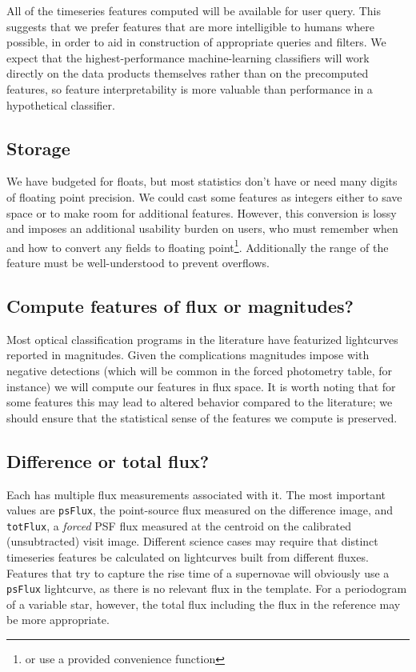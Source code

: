 \documentclass[DM,authoryear,toc]{lsstdoc}
\begin{document}
All of the timeseries features computed will be available for user query.
This suggests that we prefer features that are more intelligible to humans where possible, in order to aid in construction of appropriate queries and filters.
We expect that the highest-performance machine-learning classifiers will work directly on the data products themselves rather than on the precomputed features, so feature interpretability is more valuable than performance in a hypothetical classifier.

\subsection{Storage}

We have budgeted for floats, but most statistics don't have or need many digits of floating point precision.
We could cast some features as integers either to save space or to make room for additional features.
However, this conversion is lossy and imposes an additional usability burden on users, who must remember when and how to convert any fields to floating point\footnote{or use a provided convenience function}.
Additionally the range of the feature must be well-understood to prevent overflows.

\subsection{Compute features of flux or magnitudes?}

Most optical classification programs in the literature have featurized lightcurves reported in magnitudes.
Given the complications magnitudes impose with negative detections (which will be common in the forced photometry table, for instance) we will compute our features in flux space.
It is worth noting that for some features this may lead to altered behavior compared to the literature; we should ensure that the statistical sense of the features we compute is preserved.

\subsection{Difference or total flux?} \label{sec:totFlux}

Each \DIASource has multiple flux measurements associated with it.
The most important values are \texttt{psFlux}, the point-source flux measured on the difference image, and \texttt{totFlux}, a \textit{forced} PSF flux measured at the \DIASource centroid on the calibrated (unsubtracted) visit image.
Different science cases may require that distinct timeseries features be calculated on lightcurves built from different fluxes.
Features that try to capture the rise time of a supernovae will obviously use a \texttt{psFlux} lightcurve, as there is no relevant flux in the template.
For a periodogram of a variable star, however, the total flux including the flux in the reference may be more appropriate.
\end{document}
